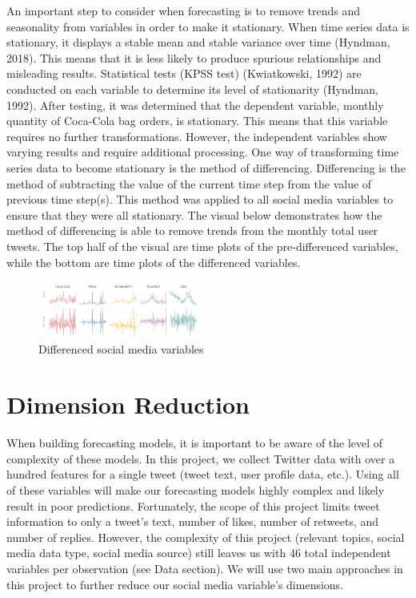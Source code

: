 \documentclass[12pt,oneside]{chicagocapstone}
\begin{document}
An important step to consider when forecasting is to remove trends and seasonality from variables in order to make it stationary. When time series data is stationary, it displays a stable mean and stable variance over time (Hyndman, 2018). This means that it is less likely to produce spurious relationships and misleading results. Statistical tests (KPSS test) (Kwiatkowski, 1992) are conducted on each variable to determine its level of stationarity (Hyndman, 1992). After testing, it was determined that the dependent variable, monthly quantity of Coca-Cola bag orders, is stationary. This means that this variable requires no further transformations. However, the independent variables show varying results and require additional processing. One way of transforming time series data to become stationary is the method of differencing. Differencing is the method of subtracting the value of the current time step from the value of previous time step(s). This method was applied to all social media variables to ensure that they were all stationary. The visual below demonstrates how the method of differencing is able to remove trends from the monthly total user tweets. The top half of the visual are time plots of the pre-differenced variables, while the bottom are time plots of the differenced variables.
\begin{figure}

{\centering \includegraphics[width=200px,angle = 0, scale=2.1]{figure/differencing} 

}

\caption{Differenced social media variables}\label{fig:differencing}
\end{figure}
\hypertarget{dimension-reduction}{%
\section*{Dimension Reduction}\label{dimension-reduction}}

When building forecasting models, it is important to be aware of the level of complexity of these models. In this project, we collect Twitter data with over a hundred features for a single tweet (tweet text, user profile data, etc.). Using all of these variables will make our forecasting models highly complex and likely result in poor predictions. Fortunately, the scope of this project limits tweet information to only a tweet's text, number of likes, number of retweets, and number of replies. However, the complexity of this project (relevant topics, social media data type, social media source) still leaves us with 46 total independent variables per observation (see Data section). We will use two main approaches in this project to further reduce our social media variable's dimensions.
\end{document}
